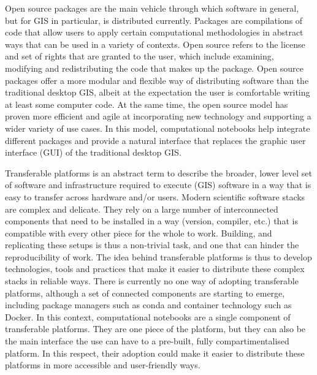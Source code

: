 \documentclass[11pt,letterpaper]{article}
\begin{document}
Open source packages are the main vehicle through which software in general, but for GIS in particular, is distributed currently. Packages are compilations of code that allow users to apply certain computational methodologies in abstract ways that can be used in a variety of contexts. Open source refers to the license and set of rights that are granted to the user, which include examining, modifying and redistributing the code that makes up the package.
%
Open source packages offer a more modular and flexible way of distributing software than the traditional desktop GIS, albeit at the expectation the user is comfortable writing at least some computer code.
At the same time, the open source model has proven more efficient and agile at incorporating new technology and supporting a wider variety of use cases.
%
In this model, computational notebooks help integrate different packages and provide a natural interface that replaces the graphic user interface (GUI) of the traditional desktop GIS.

Transferable platforms is an abstract term to describe the broader, lower level set of software and infrastructure required to execute (GIS) software in a way that is easy to transfer across hardware and/or users.
%
Modern scientific software stacks are complex and delicate. They rely on a large number of interconnected components that need to be installed in a way (version, compiler, etc.) that is compatible with every other piece for the whole to work.
%
Building, and replicating these setups is thus a non-trivial task, and one that can hinder the reproducibility of work.
%
The idea behind transferable platforms is thus to develop technologies, tools and practices that make it easier to distribute these complex stacks in reliable ways.
%
There is currently no one way of adopting transferable platforms, although a set of connected components are starting to emerge, including package managers such as conda and container technology such as Docker.
%
In this context, computational notebooks are a single component of transferable platforms. They are one piece of the platform, but they can also be the main interface the use can have to a pre-built, fully compartimentalised platform. In this respect, their adoption could make it easier to distribute these platforms in more accessible and user-friendly ways.

\end{document}
